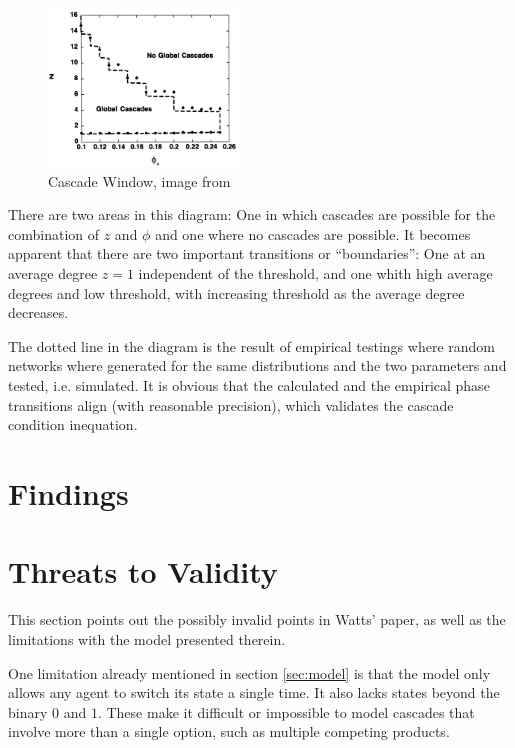 \documentclass{sig-alternate-05-2015}
\begin{document}
\begin{figure}[h!]
  \centering
  \includegraphics[width=0.45\textwidth]{img/cascade-regimes.png}
  \caption{Cascade Window, image from \cite{simplemodel}}
  \label{fig:cascade-window}
\end{figure}

There are two areas in this diagram: One in which cascades are possible for the combination of $z$ and $\phi$ and one where no cascades are possible. It becomes apparent that there are two important transitions or ``boundaries'': One at an average degree $z = 1$ independent of the threshold, and one whith high average degrees and low threshold, with increasing threshold as the average degree decreases.

The dotted line in the diagram is the result of empirical testings where random networks where generated for the same distributions and the two parameters and tested, i.e. simulated. It is obvious that the calculated and the empirical phase transitions align (with reasonable precision), which validates the cascade condition inequation.


\section{Findings}\label{sec:findings}


\section{Threats to Validity}\label{sec:threats}

This section points out the possibly invalid points in Watts' paper\cite{simplemodel}, as well as the limitations with the model presented therein.

One limitation already mentioned in section \ref{sec:model} is that the model only allows any agent to switch its state a single time. It also lacks states beyond the binary $0$ and $1$. These make it difficult or impossible to model cascades that involve more than a single option, such as multiple competing products.
\end{document}
